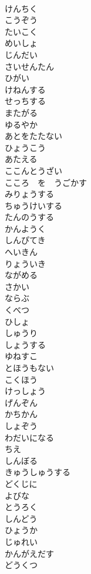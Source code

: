 \documentclass[8pt]{extreport}
\begin{document}
\begin{CJK}{UTF8}{min}
\\	けんちく
\\	こうぞう
\\	たいこく
\\	めいしょ
\\	じんだい
\\	さいせんたん
\\	ひがい
\\	けねんする
\\	せっちする
\\	またがる
\\	ゆるやか
\\	あとをたたない
\\	ひょうこう
\\	あたえる
\\	ここんとうざい
\\	こころ　を　うごかす
\\	みりょうする
\\	ちゅうけいする
\\	たんのうする
\\	かんようく
\\	しんぴてき
\\	へいきん
\\	りょういき
\\	ながめる
\\	さかい
\\	ならぶ
\\	くべつ
\\	ひしょ
\\	しゅうり
\\	しょうする
\\	ゆねすこ
\\	とほうもない
\\	こくほう
\\	けっしょう
\\	げんぞん
\\	かちかん
\\	しょぞう
\\	わだいになる
\\	ちえ
\\	しんぼる
\\	きゅうしゅうする
\\	どくじに
\\	よびな
\\	とうろく
\\	しんどう
\\	ひょうか
\\	じゅれい
\\	かんがえだす
\\	どうくつ

\end{CJK}
\end{document}
